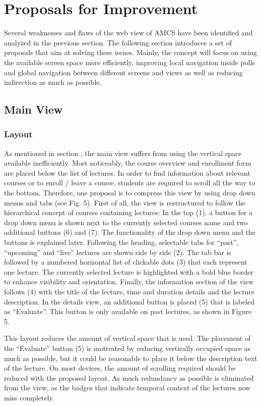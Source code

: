 \section{Proposals for Improvement}

Several weaknesses and flaws of the web view of AMCS have been identified and analyzed in the previous section.
The following section introduces a set of proposals that aim at solving these issues. Mainly, the concept will focus on using the available screen space more efficiently, improving local navigation inside polls and global navigation between different screens and views as well as reducing indirection as much as possible.

\subsection{Main View}

\subsubsection{Layout}
As mentioned in section \todosct, the main view suffers from using the vertical space available inefficiently. Most noticeably, the course overview and enrollment form are placed below the list of lectures. In order to find information about relevant courses or to enroll / leave a course, students are required to scroll all the way to the bottom. 
Therefore, one proposal is to compress this view by using drop down menus and tabs (see Fig. 5). First of all, the view is restructured to follow the hierarchical concept of courses containing lectures: In the top (1), a button for a drop down menu is shown next to the currently selected courses name and two additional buttons (6) and (7). The functionality of the drop down menu and the buttons is explained later.
Following the heading, selectable tabs for “past”, “upcoming” and “live” lectures are shown side by side (2). The tab bar is followed by a numbered horizontal list of clickable dots (3) that each represent one lecture. The currently selected lecture is highlighted with a bold blue border to enhance visibility and orientation. Finally, the information section of the view follows (4) with the title of the lecture, time and duration details and the lecture description. In the details view, an additional button is placed (5) that is labeled as “Evaluate”. This button is only available on past lectures, as shown in Figure 5.

This layout reduces the amount of vertical space that is used. The placement of the “Evaluate” button (5) is motivated by reducing vertically occupied space as much as possible, but it could be reasonable to place it below the description text of the lecture. On most devices, the amount of scrolling required should be reduced with the proposed layout. As much redundancy as possible is eliminated from the view, as the badges that indicate temporal context of the lectures now miss completely.

